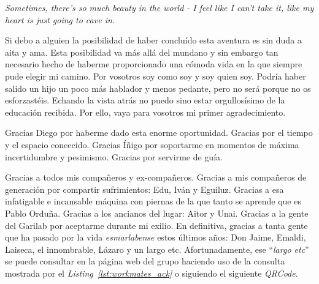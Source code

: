 



\begin{acknowledgements}      

\begin{flushright}
\emph{Sometimes, there's so much beauty in the world - I feel like I can't take it, like my heart is just going to cave in.}
\end{flushright}

\bigskip

Si debo a alguien la posibilidad de haber concluído esta aventura es sin duda a aita y ama.
Esta posibilidad va más allá del mundano y sin embargo tan necesario hecho de haberme proporcionado una cómoda vida en la que siempre pude elegir mi camino.
Por vosotros soy como soy y soy quien soy.
Podría haber salido un hijo un poco más hablador y menos pedante, pero no será porque no os esforzastéis.
Echando la vista atrás no puedo sino estar orgullosísimo de la educación recibida.
Por ello, vaya para vosotros mi primer agradecimiento.


Gracias Diego por haberme dado esta enorme oportunidad.
Gracias por el tiempo y el espacio concecido.
Gracias Íñigo por soportarme en momentos de máxima incertidumbre y pesimismo.
Gracias por servirme de guía.


Gracias a todos mis compañeros y ex-compañeros.
Gracias a mis compañeros de generación por compartir sufrimientos: Edu, Iván y Eguiluz.
Gracias a esa infatigable e incansable máquina con piernas de la que tanto se aprende que es Pablo Orduña.
Gracias a los ancianos del lugar: Aitor y Unai.
Gracias a la gente del Garilab por aceptarme durante mi exilio.
En definitiva, gracias a tanta gente que ha pasado por la vida \emph{esmarlabense} estos últimos años: Don Jaime, Emaldi, Laiseca, el innombrable, Lázaro y un largo etc.
Afortunadamente, ese ``\emph{largo etc}'' se puede consultar en la página web del grupo haciendo uso de la consulta mostrada por el \emph{Listing~\ref{lst:workmates_ack}} o siguiendo el siguiente \emph{QRCode}.




\end{acknowledgements}
